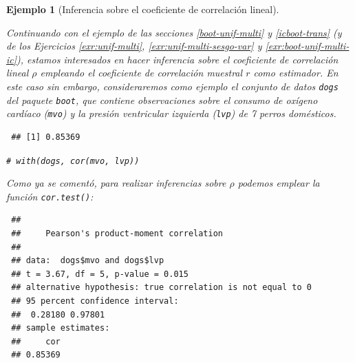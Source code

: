 \documentclass[
  spanish,
  10pt,
]{book}
\newenvironment{Shaded}{\begin{snugshade}}{\end{snugshade}}
\newcommand{\AttributeTok}[1]{\textcolor[rgb]{0.13,0.29,0.53}{#1}}
\newcommand{\CommentTok}[1]{\textcolor[rgb]{0.56,0.35,0.01}{\textit{#1}}}
\newcommand{\FunctionTok}[1]{\textcolor[rgb]{0.13,0.29,0.53}{\textbf{#1}}}
\newcommand{\NormalTok}[1]{#1}
\newcommand{\SpecialCharTok}[1]{\textcolor[rgb]{0.81,0.36,0.00}{\textbf{#1}}}
\newcommand{\StringTok}[1]{\textcolor[rgb]{0.31,0.60,0.02}{#1}}
\theoremstyle{break}
\newtheorem{example}{Ejemplo}[chapter]
\theoremstyle{nonumberplain}
\renewcommand{\CommentTok}[1]{\textcolor[rgb]{0.41,0.41,0.41}{\texttt{#1}}}
\begin{document}
\begin{example}[Inferencia sobre el coeficiente de correlación lineal]
\protect\hypertarget{exm:perm-test-cor}{}\label{exm:perm-test-cor}

Continuando con el ejemplo de las secciones \ref{boot-unif-multi} y \ref{icboot-trans} (y de los Ejercicios \ref{exr:unif-multi}, \ref{exr:unif-multi-sesgo-var} y \ref{exr:boot-unif-multi-ic}), estamos interesados en hacer inferencia sobre el coeficiente de correlación lineal \(\rho\) empleando el coeficiente de correlación muestral \(r\) como estimador.
En este caso sin embargo, consideraremos como ejemplo el conjunto de datos \texttt{dogs}
del paquete \texttt{boot}, que contiene observaciones sobre el consumo de
oxígeno cardíaco (\texttt{mvo}) y la presión ventricular izquierda (\texttt{lvp})
de 7 perros domésticos.

\begin{Shaded}
\end{Shaded}

\begin{verbatim}
 ## [1] 0.85369
\end{verbatim}

\begin{Shaded}
\begin{Highlighting}[]
\CommentTok{\# with(dogs, cor(mvo, lvp))}
\end{Highlighting}
\end{Shaded}

Como ya se comentó, para realizar inferencias sobre \(\rho\) podemos emplear la función \texttt{cor.test()}:

\begin{Shaded}
\end{Shaded}

\begin{verbatim}
 ## 
 ##     Pearson's product-moment correlation
 ## 
 ## data:  dogs$mvo and dogs$lvp
 ## t = 3.67, df = 5, p-value = 0.015
 ## alternative hypothesis: true correlation is not equal to 0
 ## 95 percent confidence interval:
 ##  0.28180 0.97801
 ## sample estimates:
 ##     cor 
 ## 0.85369
\end{verbatim}


\end{example}
\end{document}
